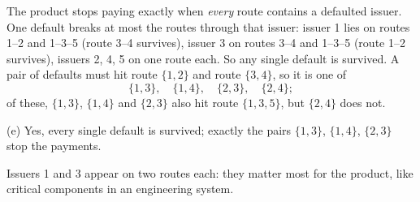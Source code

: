 \begin{solution}
	 The product stops paying exactly when
	\emph{every} route contains a defaulted issuer. One default breaks at most the
	routes through that issuer: issuer 1 lies on routes 1--2 and 1--3--5 (route
	3--4 survives), issuer 3 on routes 3--4 and 1--3--5 (route 1--2 survives),
	issuers 2, 4, 5 on one route each. So any single default is survived. A pair
	of defaults must hit route $\{1,2\}$ and route $\{3,4\}$, so it is one of
	\[ \{1,3\},\quad \{1,4\},\quad \{2,3\},\quad \{2,4\}; \]
	of these, $\{1,3\}$, $\{1,4\}$ and
	$\{2,3\}$ also hit route $\{1,3,5\}$, but $\{2,4\}$ does not.
	\begin{answer}
		(e) Yes, every single default is survived; exactly the pairs $\{1,3\}$,
		$\{1,4\}$, $\{2,3\}$ stop the payments.
	\end{answer}
	\begin{remark}
		Issuers 1 and 3 appear on two routes each: they matter most for the
		product, like critical components in an engineering system.
	\end{remark}
\end{solution}
